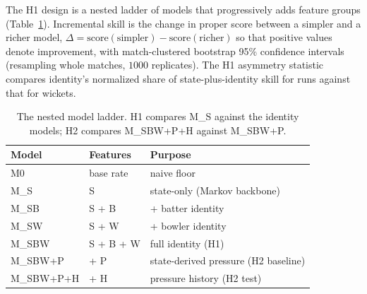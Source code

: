 The H1 design is a nested ladder of models that progressively adds feature
groups (Table~\ref{tab:ladder-spec}). Incremental skill is the change in proper
score between a simpler and a richer model, $\Delta = \text{score}(\text{simpler})
- \text{score}(\text{richer})$ so that positive values denote improvement, with
match-clustered bootstrap 95\% confidence intervals (resampling whole matches,
$1000$ replicates). The H1 asymmetry statistic compares identity's normalized
share of state-plus-identity skill for runs against that for wickets.

\begin{table}[t]
\centering
\small
\begin{tabular}{lll}
\toprule
Model & Features & Purpose \\
\midrule
M0          & base rate            & naive floor \\
M\_S        & S                    & state-only (Markov backbone) \\
M\_SB       & S + B                & + batter identity \\
M\_SW       & S + W                & + bowler identity \\
M\_SBW      & S + B + W            & full identity (H1) \\
M\_SBW+P    & + P                  & state-derived pressure (H2 baseline) \\
M\_SBW+P+H  & + H                  & pressure history (H2 test) \\
\bottomrule
\end{tabular}
\caption{The nested model ladder. H1 compares M\_S against the identity models;
H2 compares M\_SBW+P+H against M\_SBW+P.}
\label{tab:ladder-spec}
\end{table}

